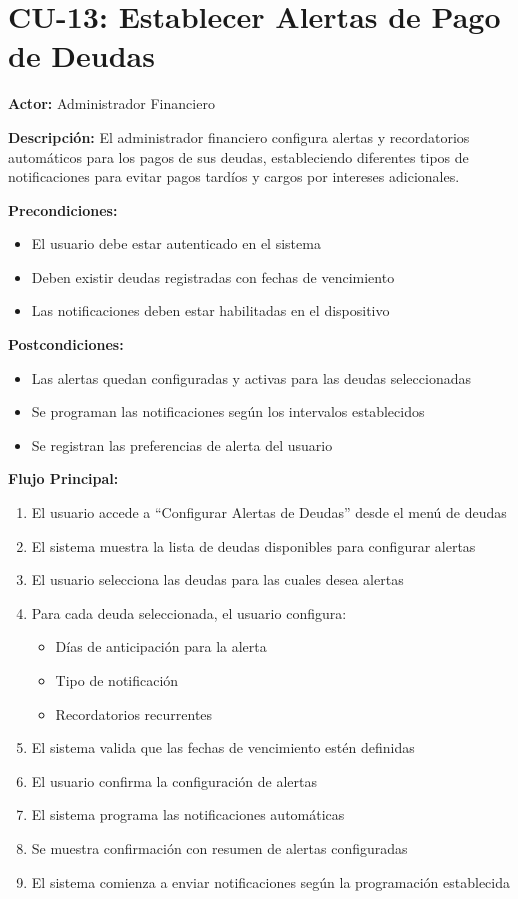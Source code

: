\section{CU-13: Establecer Alertas de Pago de Deudas}

\noindent\textbf{Actor:} Administrador Financiero

\noindent\textbf{Descripción:} El administrador financiero configura alertas y recordatorios automáticos para los pagos de sus deudas, estableciendo diferentes tipos de notificaciones para evitar pagos tardíos y cargos por intereses adicionales.

\noindent\textbf{Precondiciones:}
\begin{itemize}
    \item El usuario debe estar autenticado en el sistema
    \item Deben existir deudas registradas con fechas de vencimiento
    \item Las notificaciones deben estar habilitadas en el dispositivo
\end{itemize}

\noindent\textbf{Postcondiciones:}
\begin{itemize}
    \item Las alertas quedan configuradas y activas para las deudas seleccionadas
    \item Se programan las notificaciones según los intervalos establecidos
    \item Se registran las preferencias de alerta del usuario
\end{itemize}

\noindent\textbf{Flujo Principal:}
\begin{enumerate}
    \item El usuario accede a ``Configurar Alertas de Deudas'' desde el menú de deudas
    \item El sistema muestra la lista de deudas disponibles para configurar alertas
    \item El usuario selecciona las deudas para las cuales desea alertas
    \item Para cada deuda seleccionada, el usuario configura:
    \begin{itemize}
        \item Días de anticipación para la alerta
        \item Tipo de notificación
        \item Recordatorios recurrentes
    \end{itemize}
    \item El sistema valida que las fechas de vencimiento estén definidas
    \item El usuario confirma la configuración de alertas
    \item El sistema programa las notificaciones automáticas
    \item Se muestra confirmación con resumen de alertas configuradas
    \item El sistema comienza a enviar notificaciones según la programación establecida
\end{enumerate}

